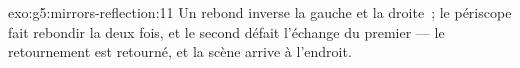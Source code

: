 \begin{solution}{exo:g5:mirrors-reflection:11}
Un rebond inverse la gauche et la droite~; le périscope fait rebondir
la  deux fois, et le second  défait l'échange du
premier --- le retournement est retourné, et la scène arrive à
l'endroit.
\end{solution}
